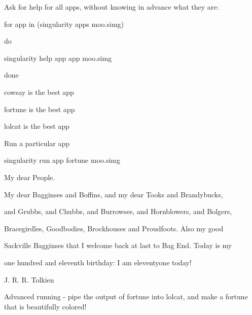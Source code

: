 \documentclass[letterpaper,10pt,english]{sphinxmanual}
\begin{document}
Ask for help for all apps, without knowing in advance what they are:

%
\begin{sphinxVerbatim}[commandchars=\\\{\}]
for app in \PYGZdl{}(singularity apps moo.simg)

   do

     singularity help \PYGZhy{}\PYGZhy{}app \PYGZdl{}app moo.simg

done

cowsay is the best app

fortune is the best app

lolcat is the best app
\end{sphinxVerbatim}

Run a particular app

%
\begin{sphinxVerbatim}[commandchars=\\\{\}]
singularity run \PYGZhy{}\PYGZhy{}app fortune moo.simg

    My dear People.

    My dear Bagginses and Boffins, and my dear Tooks and Brandybucks,

and Grubbs, and Chubbs, and Burrowses, and Hornblowers, and Bolgers,

Bracegirdles, Goodbodies, Brockhouses and Proudfoots.  Also my good

Sackville Bagginses that I welcome back at last to Bag End.  Today is my

one hundred and eleventh birthday: I am eleventy\PYGZhy{}one today!\PYGZdq{}

        \PYGZhy{}\PYGZhy{} J. R. R. Tolkien
\end{sphinxVerbatim}

Advanced running - pipe the output of fortune into lolcat, and make a
fortune that is beautifully colored!

%
\begin{sphinxVerbatim}[commandchars=\\\{\}]
          

     
\end{sphinxVerbatim}
\end{document}
